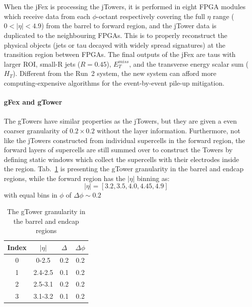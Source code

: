 \\
\\When the jFex is processing the jTowers, it is performed in eight FPGA modules which receive data from each $\phi$-octant respectively covering the full $\eta$ range ($0<|\eta|<4.9$) from the barrel to forward region, and the jTower data is duplicated to the neighbouring FPGAs\cite{Aad:1602235}. This is to properly reconstruct the physical objects (jets or tau decayed with widely spread signatures) at the transition region between FPGAs. The final outputs of the jFex are taus with larger ROI, small-R jets ($R=0.45$), $E^{miss}_{T}$, and the transverse energy scalar sum ($H_{T}$). Different from the Run~2 system, the new system can afford more computing-expensive algorithms for the event-by-event pile-up mitigation. 
\\
\\{\bf gFex and gTower}
\\
\\The gTowers have similar properties as the jTowers, but they are given a even coarser granularity of $0.2\times0.2$ without the layer information. Furthermore, not like the jTowers constructed from individual supercells in the forward region, the forward layers of supercells are still summed over to construct the Towers by defining static windows which collect the supercells with their electrodes inside the region. Tab.~\ref{Tab:granularity_gT} is presenting the gTower granularity in the barrel and endcap regions, while the forward region has the $|\eta|$ binning as:
\begin{equation}
|\eta| = \left[3.2, 3.5, 4.0, 4.45, 4.9\right]
\end{equation}
with equal bins in $\phi$ of $\Delta\phi\sim0.2$
\begin{table}[h]
	\caption{The gTower granularity in the barrel and endcap regions}
	\renewcommand{\arraystretch}{1.3}
	\centering
	\begin{tabular}{| c | c | c | c | }
		\hline
		\hline
		Index      &    $|\eta|$        &     $\Delta$     & $\Delta\phi$   \\
		\hline
		0          &     0-2.5          & 0.2                          &  0.2                          \\
		\hline
		1          &     2.4-2.5           & 0.1                          &  0.2                         \\
		\hline
		2      &     2.5-3.1       & 0.2                      &  0.2                       \\
		\hline 
		3      &     3.1-3.2       & 0.1                      &  0.2                       \\
		\hline
		\hline
	\end{tabular}
	\label{Tab:granularity_gT}
\end{table}
